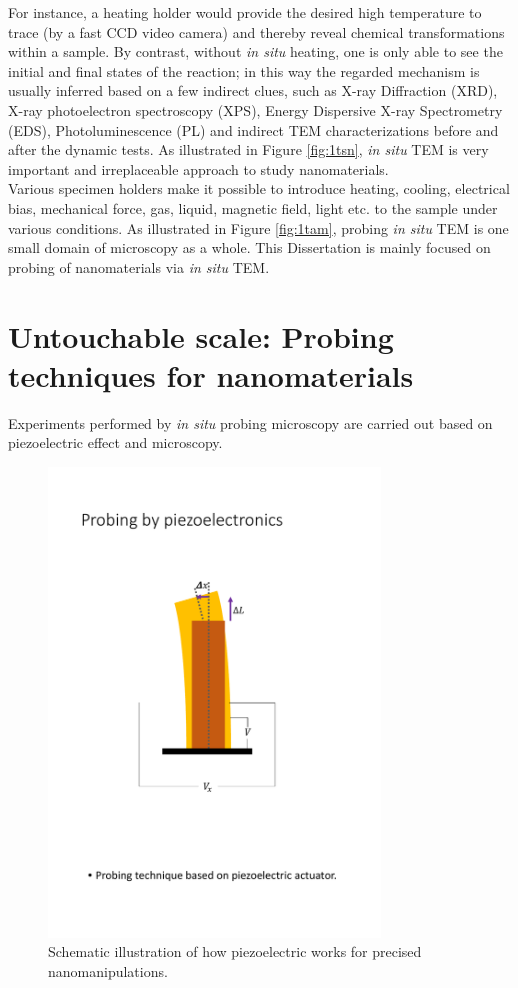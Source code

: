 For instance, a heating holder would provide the desired high temperature to trace (by a fast CCD video camera) and thereby reveal chemical transformations within a sample. By contrast, without \emph{in situ} heating, one is  only able to see the initial and final states of the reaction; in this way the regarded mechanism is usually inferred based on a few indirect clues, such as X-ray Diffraction (XRD), X-ray photoelectron spectroscopy (XPS), Energy Dispersive X-ray Spectrometry (EDS), Photoluminescence (PL) and indirect TEM characterizations before and after the dynamic tests. As illustrated in Figure \ref{fig:1tsn}, \emph{in situ} TEM is very important and irreplaceable approach to study nanomaterials. \\

Various specimen holders make it possible to introduce heating, cooling, electrical bias, mechanical force, gas, liquid, magnetic field, light etc. to the sample under various conditions. As illustrated in Figure \ref{fig:1tam}, probing \emph{in situ} TEM is one small domain of microscopy as a whole. This Dissertation is mainly focused on probing of nanomaterials via \emph{in situ} TEM. 

\section{Untouchable scale: Probing techniques for nanomaterials}

Experiments performed by \textit{in situ} probing microscopy are carried out based on piezoelectric effect and microscopy. \\

\begin{figure}  
\centering
\includegraphics[width=250pt]{figures/figure1_piezo.pdf}
\caption[Probing by piezoelectronics]{Schematic illustration of how piezoelectric works for precised nanomanipulations.
\label{fig:1piezo}}
\end{figure}

